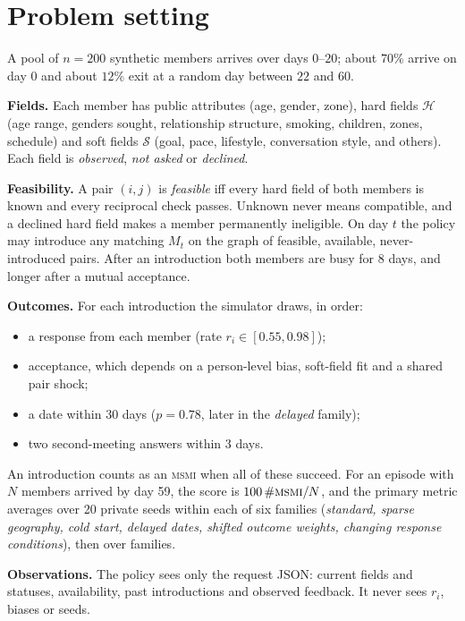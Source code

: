 \documentclass[10pt]{article}
\newcommand{\msmi}{\textsc{msmi}}
\begin{document}
\section{Problem setting}\label{sec:setting}

A pool of $n=200$ synthetic members arrives over days $0$--$20$; about $70\%$ arrive on day $0$ and about $12\%$ exit at a random day between $22$ and $60$.

\textbf{Fields.} Each member has public attributes (age, gender, zone), hard fields $\mathcal{H}$ (age range, genders sought, relationship structure, smoking, children, zones, schedule) and soft fields $\mathcal{S}$ (goal, pace, lifestyle, conversation style, and others). Each field is \emph{observed}, \emph{not asked} or \emph{declined}.

\textbf{Feasibility.} A pair $(i,j)$ is \emph{feasible} iff every hard field of both members is known and every reciprocal check passes. Unknown never means compatible, and a declined hard field makes a member permanently ineligible. On day $t$ the policy may introduce any matching $M_t$ on the graph of feasible, available, never-introduced pairs. After an introduction both members are busy for 8 days, and longer after a mutual acceptance.

\textbf{Outcomes.} For each introduction the simulator draws, in order:
\begin{itemize}
\item a response from each member (rate $r_i \in [0.55, 0.98]$);
\item acceptance, which depends on a person-level bias, soft-field fit and a shared pair shock;
\item a date within 30 days ($p=0.78$, later in the \emph{delayed} family);
\item two second-meeting answers within 3 days.
\end{itemize}
An introduction counts as an \msmi{} when all of these succeed. For an episode with $N$ members arrived by day 59, the score is $100\,\#\msmi/N$, and the primary metric averages over 20 private seeds within each of six families (\emph{standard, sparse geography, cold start, delayed dates, shifted outcome weights, changing response conditions}), then over families.

\textbf{Observations.} The policy sees only the request JSON: current fields and statuses, availability, past introductions and observed feedback. It never sees $r_i$, biases or seeds.
\end{document}
